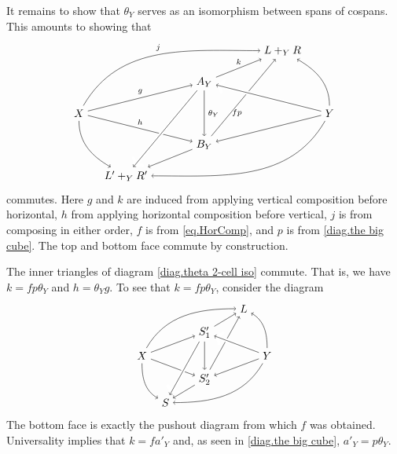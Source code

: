 \documentclass{tac}
\begin{document}
It remains to show that $\theta_Y$ serves as 
an isomorphism between spans of cospans. This 
amounts to showing that
	\begin{equation} \label{diag.theta 2-cell iso}
		\begin{tikzpicture}
		\node (X) at (-4,0) {$X$};
		\node (LyR) at (2.5,2) {$L+_YR$};
		\node (Y) at (4,0) {$Y$};
		\node (LyR') at (-2.5,-2) {$L'+_YR'$};
		\node (Ay) at (0,1) {$A_Y$};
		\node (By) at (0,-1) {$B_Y$};
		\draw [font=\scriptsize,->] (X) edge[in=180,out=60] node[above] {$j$} (LyR);
		\draw [font=\scriptsize,->] (X) edge node[above] {$g$} (Ay);
		\draw [font=\scriptsize,->] (X) edge node[above] {$h$} (By);
		\draw [->] (X) edge[out=-90,in=150] (LyR');
		\draw [->] (Y) edge[out=90,in=-30] (LyR);
		\draw [->] (Y) edge[] (By);
		\draw [->] (Y) edge[out=-120,in=0] (LyR');
		\draw [font=\scriptsize,->] (Ay) edge node[above] {$k$} (LyR);
		\draw [font=\scriptsize,->] (Ay) edge node[right] {$\theta_Y$} (By);
		\draw [font=\scriptsize,->] (By) edge[pos=0.4] node[below] {$fp$} (LyR);
		\draw [->] (By) edge[] (LyR');
		\draw [->] (Y) edge[white,line width=3.5pt] (Ay);
		\draw [->] (Y) edge[] (Ay);
		\draw [->] (Ay) edge[white,line width=3.5pt] (LyR');
		\draw [->] (Ay) edge[] (LyR');
		\end{tikzpicture}
	\end{equation}
commutes. Here $g$ and $k$ are induced from 
applying vertical composition before horizontal, 
$h$ from applying horizontal composition before vertical, 
$j$ is from composing in either order, $f$ is from 
	 \eqref{eq.HorComp}, 
and $p$ is from 
	\eqref{diag.the big cube}.  
The top and bottom face commute by construction.

\lemma
	The inner triangles of diagram 
		\eqref{diag.theta 2-cell iso} 
	commute. That is, we have 
		$ k = f p  \theta_Y$ 
	and 
		$ h = \theta_Y g $.
\endlemma
\proof	
	To see that 
		$ k = f p \theta_Y $, 
	consider the diagram
	\[
		\begin{tikzpicture}
		\node (X) at (-2,0) {$X$};
		\node (L) at (1.25,1.5) {$L$};
		\node (Y) at (2,0) {$Y$};
		\node (S) at (-1.25,-1.5) {$S$};
		\node (S'1) at (0,0.75) {$S'_1$};
		\node (S'2) at (0,-0.75) {$S'_2$};
		\draw [->] (X) edge[in=180,out=60] (L);
		\draw [->] (X) edge[] (S'1);
		\draw [->] (X) edge[] (S'2);
		\draw [->] (X) edge[out=-90,in=150] (S);
		\draw [->] (Y) edge[out=90,in=-30] (L);
		\draw [->] (Y) edge[] (S'2);
		\draw [->] (Y) edge[out=-120,in=0] (S);
		\draw [->] (S'1) edge[] (L);
		\draw [->] (S'1) edge[white,line width=3.5pt] (S);
		\draw [->] (S'1) edge[] (S);
		\draw [->] (S'1) edge[] (S'2);
		\draw [->] (S'2) edge[] (L);
		\draw [->] (S'2) edge[] (S);
		\draw [->] (Y) edge[white,line width=3.5pt] (S'1);
		\draw [->] (Y) edge[] (S'1);
		\end{tikzpicture}
	\]
	The bottom face is exactly the pushout diagram 
	from which $f$ was obtained.  Universality implies that 
		$ k = f a'_Y $ 
	and, as seen in 
		\eqref{diag.the big cube}, 
	$ a'_Y = p \theta_Y $. 
	
\end{document}
